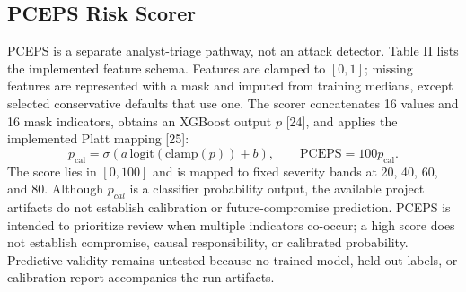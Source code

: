 \documentclass[conference]{IEEEtran}
\begin{document}
\subsection{PCEPS Risk Scorer}
PCEPS is a separate analyst-triage pathway, not an attack detector. Table II lists the implemented feature schema. Features are clamped to $[0,1]$; missing features are represented with a mask and imputed from training medians, except selected conservative defaults that use one. The scorer concatenates 16 values and 16 mask indicators, obtains an XGBoost output $p$ [24], and applies the implemented Platt mapping [25]:
\begin{equation}
p_{\mathrm{cal}}=\sigma\!\left(a\,\mathrm{logit}(\mathrm{clamp}(p))+b\right),\qquad \mathrm{PCEPS}=100p_{\mathrm{cal}}.
\label{eq:pceps}
\end{equation}
The score lies in $[0,100]$ and is mapped to fixed severity bands at 20, 40, 60, and 80. Although $p_{cal}$ is a classifier probability output, the available project artifacts do not establish calibration or future-compromise prediction.
PCEPS is intended to prioritize review when multiple indicators co-occur; a high score does not establish compromise, causal responsibility, or calibrated probability. Predictive validity remains untested because no trained model, held-out labels, or calibration report accompanies the run artifacts.
\end{document}

